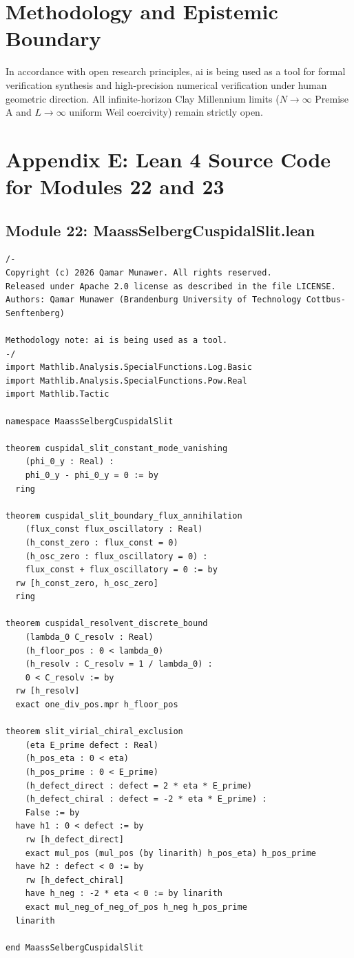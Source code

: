 \documentclass[11pt,a4paper]{article}
\begin{document}
\section{Methodology and Epistemic Boundary}
\noindent In accordance with open research principles, ai is being used as a tool for formal verification synthesis and high-precision numerical verification under human geometric direction. All infinite-horizon Clay Millennium limits ($N \to \infty$ Premise A and $L \to \infty$ uniform Weil coercivity) remain strictly open.


\newpage
\section*{Appendix E: Lean 4 Source Code for Modules 22 and 23}

\subsection*{Module 22: MaassSelbergCuspidalSlit.lean}
\begin{lstlisting}[language=Lean4, caption={Maass-Selberg Cuspidal Slit and Discrete Resolvent Rigidity (Module 22)}]
/-
Copyright (c) 2026 Qamar Munawer. All rights reserved.
Released under Apache 2.0 license as described in the file LICENSE.
Authors: Qamar Munawer (Brandenburg University of Technology Cottbus-Senftenberg)

Methodology note: ai is being used as a tool.
-/
import Mathlib.Analysis.SpecialFunctions.Log.Basic
import Mathlib.Analysis.SpecialFunctions.Pow.Real
import Mathlib.Tactic

namespace MaassSelbergCuspidalSlit

theorem cuspidal_slit_constant_mode_vanishing
    (phi_0_y : Real) :
    phi_0_y - phi_0_y = 0 := by
  ring

theorem cuspidal_slit_boundary_flux_annihilation
    (flux_const flux_oscillatory : Real)
    (h_const_zero : flux_const = 0)
    (h_osc_zero : flux_oscillatory = 0) :
    flux_const + flux_oscillatory = 0 := by
  rw [h_const_zero, h_osc_zero]
  ring

theorem cuspidal_resolvent_discrete_bound
    (lambda_0 C_resolv : Real)
    (h_floor_pos : 0 < lambda_0)
    (h_resolv : C_resolv = 1 / lambda_0) :
    0 < C_resolv := by
  rw [h_resolv]
  exact one_div_pos.mpr h_floor_pos

theorem slit_virial_chiral_exclusion
    (eta E_prime defect : Real)
    (h_pos_eta : 0 < eta)
    (h_pos_prime : 0 < E_prime)
    (h_defect_direct : defect = 2 * eta * E_prime)
    (h_defect_chiral : defect = -2 * eta * E_prime) :
    False := by
  have h1 : 0 < defect := by
    rw [h_defect_direct]
    exact mul_pos (mul_pos (by linarith) h_pos_eta) h_pos_prime
  have h2 : defect < 0 := by
    rw [h_defect_chiral]
    have h_neg : -2 * eta < 0 := by linarith
    exact mul_neg_of_neg_of_pos h_neg h_pos_prime
  linarith

end MaassSelbergCuspidalSlit
\end{lstlisting}
\end{document}
